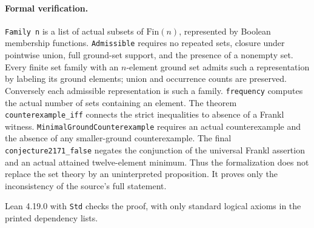 \documentclass[11pt]{article}
\begin{document}
\paragraph{Formal verification.}
\texttt{Family n} is a list of actual subsets of $\mathrm{Fin}(n)$, represented
by Boolean membership functions. \texttt{Admissible} requires no repeated
sets, closure under pointwise union, full ground-set support, and the
presence of a nonempty set. Every finite set family with an $n$-element
ground set admits such a representation by labeling its ground elements;
union and occurrence counts are preserved. Conversely each admissible
representation is such a family. \texttt{frequency} computes the actual
number of sets containing an element. The theorem
\texttt{counterexample\_\allowbreak{}iff} connects the strict inequalities to absence
of a Frankl witness. \texttt{MinimalGroundCounterexample} requires an
actual counterexample and the absence of any smaller-ground counterexample.
The final \texttt{conjecture2171\_\allowbreak{}false} negates the conjunction of the
universal Frankl assertion and an actual attained twelve-element minimum.
Thus the formalization does not replace the set theory by an uninterpreted
proposition. It proves only the inconsistency of the source's full statement.

Lean 4.19.0 with \texttt{Std} checks the proof, with only standard logical
axioms in the printed dependency lists.
\end{document}
